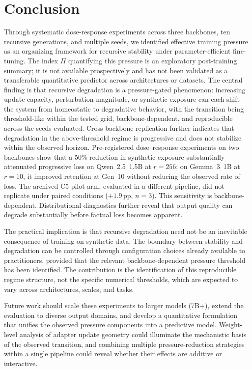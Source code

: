 \documentclass[a4paper,fleqn]{cas-dc}
\newif\ifshowchanges
\newcommand{\rev}[1]{\ifshowchanges{\color{blue}#1}\else{#1}\fi}
\begin{document}
\section{Conclusion}\label{sec:conclusion}

Through systematic dose-response experiments across three backbones, ten
recursive generations, and multiple seeds, we identified effective training
pressure as an organizing framework for recursive stability under
parameter-efficient fine-tuning. \rev{The index $\Pi$ quantifying this pressure is an
exploratory post-training summary; it is not available prospectively and has
not been validated as a transferable quantitative predictor across
architectures or datasets.} The central finding is that recursive
degradation is a pressure-gated phenomenon: increasing update capacity,
perturbation magnitude, or synthetic exposure \rev{can each shift} the system from homeostatic to degradative behavior, with the transition being
\rev{threshold-like within the tested grid}, backbone-dependent, and reproducible across the seeds evaluated. Cross-backbone replication \rev{further indicates} that degradation in the above-threshold regime is progressive and does not
stabilize within the observed horizon. \rev{Pre-registered dose--response
experiments on two backbones show that a 50\% reduction in synthetic exposure
\rev{substantially} attenuated progressive loss on \rev{Qwen~2.5~1.5B at $r=256$}; on \rev{Gemma~3~1B at $r=10$}, it improved
retention at Gen~10 without reducing the observed rate of loss. The archived C5 pilot arm, evaluated in a
different pipeline, did not replicate under paired conditions ($+1.9$\,pp,
$n=3$).} This sensitivity is backbone-dependent. Distributional diagnostics further reveal
that output quality can degrade substantially before factual loss becomes
apparent.

The practical implication is that recursive degradation need not be an
inevitable consequence of training on synthetic data. The boundary between
stability and degradation can be controlled through configuration choices
already available to practitioners, provided that the relevant
backbone-dependent pressure threshold has been identified. The contribution is
the identification of this reproducible regime structure, not the specific
numerical thresholds, which are expected to vary across architectures, scales,
and tasks.

Future work should scale these experiments to larger models (7B+), extend the
evaluation to diverse output domains, and develop a quantitative formulation
that unifies the observed pressure components into a predictive model.
Weight-level analysis of adapter update geometry could illuminate the
mechanistic basis of the observed transition, and combining multiple
pressure-reduction strategies within a single pipeline could reveal whether
their effects are additive or interactive.
\end{document}
